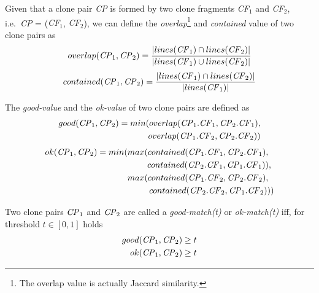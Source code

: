\documentclass[sigconf,review, anonymous]{acmart}
\newcommand{\squeezeup}{\vspace{-0.5mm}}
\begin{document}
Given that a clone pair \textit{CP} is formed by two clone fragments
\textit{CF$_1$} and \textit{CF$_2$}, i.e.~\textit{CP} = (\textit{CF$_1$},
\textit{CF$_2$}), we can define the \textit{overlap}\footnote{The overlap value is actually Jaccard similarity.} and
\textit{contained} value of two clone pairs as
\begin{displaymath}
  overlap(\textrm{\textit{CP}}_1, \textrm{\textit{CP}}_2) = \frac{|lines(\textrm{\textit{CF}}_1) \cap lines(\textrm{\textit{CF}}_2)|}{|lines(\textrm{\textit{CF}}_1) \cup lines(\textrm{\textit{CF}}_2)|} 
\end{displaymath}
\begin{displaymath}
  contained(\textrm{\textit{CP}}_1, \textrm{\textit{CP}}_2) = \frac{|lines(\textrm{\textit{CF}}_1) \cap lines(\textrm{\textit{CF}}_2)|}{|lines(\textrm{\textit{CF}}_1)|}
\end{displaymath}
      
\noindent%
The \textit{good-value}  and the \textit{ok-value}  of two clone pairs are defined as
\begin{align*}
	good(\textrm{\textit{CP}}_1, \textrm{\textit{CP}}_2) = min(overlap(\textrm{\textit{CP}}_1.\textrm{\textit{CF}}_1,\textrm{\textit{CP}}_2.\textrm{\textit{CF}}_1), \\ overlap(\textrm{\textit{CP}}_1.\textrm{\textit{CF}}_2,\textrm{\textit{CP}}_2.\textrm{\textit{CF}}_2))
\end{align*}
\begin{align*}
	ok(\textrm{\textit{CP}}_1,\textrm{\textit{CP}}_2) = min(max(contained(\textrm{\textit{CP}}_1.\textrm{\textit{CF}}_1,\textrm{\textit{CP}}_2.\textrm{\textit{CF}}_1),~~ \\ contained(\textrm{\textit{CP}}_2.\textrm{\textit{CF}}_1,\textrm{\textit{CP}}_1.\textrm{\textit{CF}}_1)),~
	\\ max(contained(\textrm{\textit{CP}}_1.\textrm{\textit{CF}}_2,\textrm{\textit{CP}}_2.\textrm{\textit{CF}}_2),~~ \\contained(\textrm{\textit{CP}}_2.\textrm{\textit{CF}}_2,\textrm{\textit{CP}}_1.\textrm{\textit{CF}}_2)))
\end{align*}

\noindent%
Two clone pairs $\textrm{\textit{CP}}_1$ and $\textrm{\textit{CP}}_2$
are called a \textit{\textit{good-match}(t)} or \textit{ok-match(t)}  iff, for threshold $t \in [0,1]$ holds 
\begin{align*}
good(\textrm{\textit{CP}}_1,\textrm{\textit{CP}}_2) & \geq t\\
ok(\textrm{\textit{CP}}_1,\textrm{\textit{CP}}_2) & \geq t
\end{align*}
\end{document}
